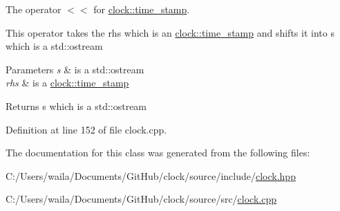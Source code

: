 The operator $<$$<$ for \hyperlink{classclock_1_1time__stamp}{clock\+::time\+\_\+stamp}. 

This operator takes the rhs which is an \hyperlink{classclock_1_1time__stamp}{clock\+::time\+\_\+stamp} and shifts it into s which is a std\+::ostream 
\begin{DoxyParams}{Parameters}
{\em s} & is a std\+::ostream \\
\hline
{\em rhs} & is a \hyperlink{classclock_1_1time__stamp}{clock\+::time\+\_\+stamp} \\
\hline
\end{DoxyParams}
\begin{DoxyReturn}{Returns}
s which is a std\+::ostream 
\end{DoxyReturn}


Definition at line 152 of file clock.\+cpp.



The documentation for this class was generated from the following files\+:\begin{DoxyCompactItemize}
\item 
C\+:/\+Users/waila/\+Documents/\+Git\+Hub/clock/source/include/\hyperlink{clock_8hpp}{clock.\+hpp}\item 
C\+:/\+Users/waila/\+Documents/\+Git\+Hub/clock/source/src/\hyperlink{clock_8cpp}{clock.\+cpp}\end{DoxyCompactItemize}
